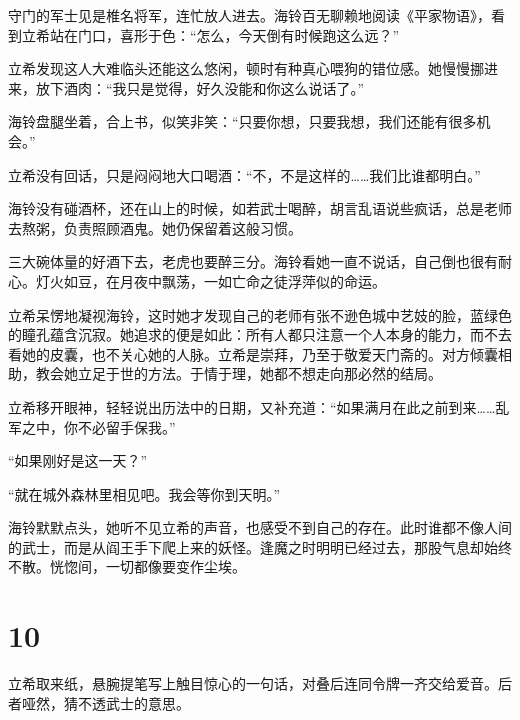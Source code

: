 \documentclass{article}
\begin{document}
守门的军士见是椎名将军，连忙放人进去。海铃百无聊赖地阅读《平家物语》，看到立希站在门口，喜形于色：“怎么，今天倒有时候跑这么远？”



立希发现这人大难临头还能这么悠闲，顿时有种真心喂狗的错位感。她慢慢挪进来，放下酒肉：“我只是觉得，好久没能和你这么说话了。”



海铃盘腿坐着，合上书，似笑非笑：“只要你想，只要我想，我们还能有很多机会。”



立希没有回话，只是闷闷地大口喝酒：“不，不是这样的……我们比谁都明白。”



海铃没有碰酒杯，还在山上的时候，如若武士喝醉，胡言乱语说些疯话，总是老师去熬粥，负责照顾酒鬼。她仍保留着这般习惯。



三大碗体量的好酒下去，老虎也要醉三分。海铃看她一直不说话，自己倒也很有耐心。灯火如豆，在月夜中飘荡，一如亡命之徒浮萍似的命运。



立希呆愣地凝视海铃，这时她才发现自己的老师有张不逊色城中艺妓的脸，蓝绿色的瞳孔蕴含沉寂。她追求的便是如此：所有人都只注意一个人本身的能力，而不去看她的皮囊，也不关心她的人脉。立希是崇拜，乃至于敬爱天门斋的。对方倾囊相助，教会她立足于世的方法。于情于理，她都不想走向那必然的结局。



立希移开眼神，轻轻说出历法中的日期，又补充道：“如果满月在此之前到来……乱军之中，你不必留手保我。”



“如果刚好是这一天？”



“就在城外森林里相见吧。我会等你到天明。”



海铃默默点头，她听不见立希的声音，也感受不到自己的存在。此时谁都不像人间的武士，而是从阎王手下爬上来的妖怪。逢魔之时明明已经过去，那股气息却始终不散。恍惚间，一切都像要变作尘埃。





{\centering\section*{10}}





立希取来纸，悬腕提笔写上触目惊心的一句话，对叠后连同令牌一齐交给爱音。后者哑然，猜不透武士的意思。
\end{document}
